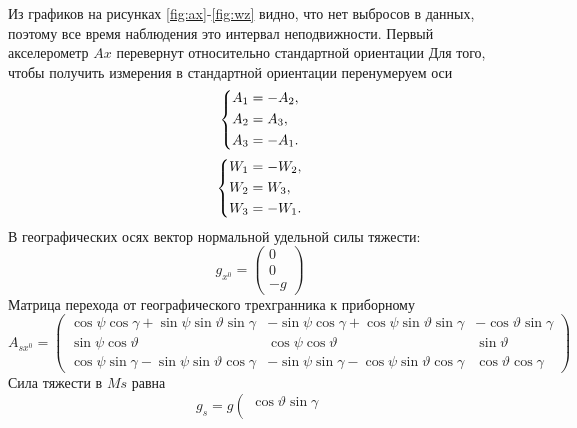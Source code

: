 \documentclass[a4paper,14pt]{article}
\theoremstyle{plain} %
\theoremstyle{definition} %
\theoremstyle{remark} %
\begin{document}
{Из графиков на рисунках \eqref{fig:ax}-\eqref{fig:wz} видно,
что нет выбросов в данных, поэтому все время наблюдения это интервал неподвижности.
Первый акселерометр $Ax$ перевернут относительно стандартной ориентации
Для того, чтобы получить измерения в стандартной ориентации перенумеруем оси
\begin{equation}\label{aksel}
    \left\{ {\begin{aligned}
                 & A_1=-A_2 , \hfill \\
                 & A_2=A_3, \hfill   \\
                 & A_3=-A_1. \hfill  \\
            \end{aligned}} \right.
\end{equation}
\begin{equation}\label{dus}
    \left\{ {\begin{aligned}
                 & W_1=-W_2, \hfill \\
                 & W_2=W_3, \hfill  \\
                 & W_3=-W_1. \hfill \\
            \end{aligned}} \right.
\end{equation}
В географических осях вектор нормальной удельной силы тяжести:
$$
    g_{x^{0}}=\left(\begin{array}{r}
            0 \\
            0 \\
            -g
        \end{array}\right)
$$
Матрица перехода от географического трехгранника к приборному
$$
    A_{s x^{0}}=\left(\begin{array}{ccc}
            \cos \psi \cos \gamma+\sin \psi \sin \vartheta \sin \gamma & -\sin \psi \cos \gamma+\cos \psi \sin \vartheta \sin \gamma & -\cos \vartheta \sin \gamma \\
            \sin \psi \cos \vartheta                                   & \cos \psi \cos \vartheta                                    & \sin \vartheta              \\
            \cos \psi \sin \gamma-\sin \psi \sin \vartheta \cos \gamma & -\sin \psi \sin \gamma-\cos \psi \sin \vartheta \cos \gamma & \cos \vartheta \cos \gamma
        \end{array}\right)
$$
Сила тяжести в $Ms$ равна
$$
    g_{s}=g\left(\begin{array}{c}
            \cos \vartheta \sin \gamma \\

\end{array}$$}
\end{document}
